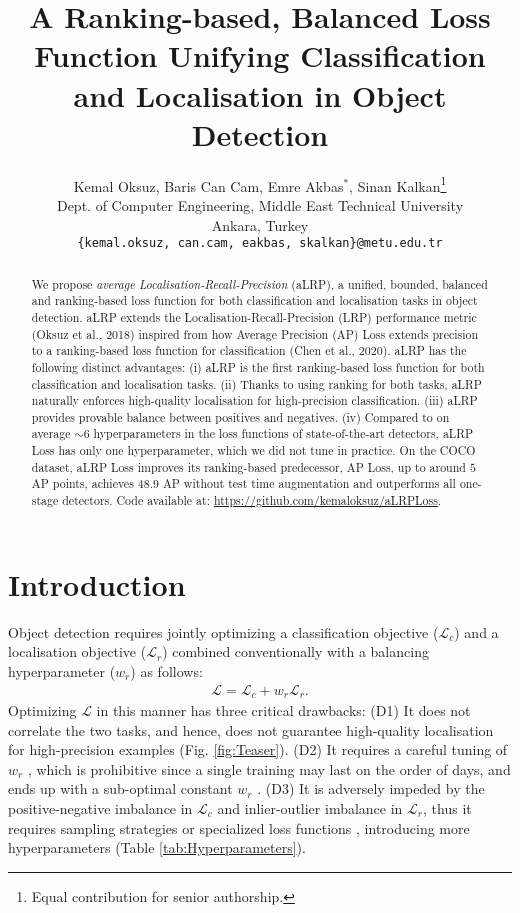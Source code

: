 \documentclass{article}
\title{A Ranking-based, Balanced Loss Function Unifying Classification and Localisation in Object Detection }
\author{Kemal Oksuz, Baris Can Cam, Emre Akbas$^*$, Sinan Kalkan\thanks{Equal contribution for senior authorship.}\\
  Dept. of Computer Engineering, Middle East Technical University\\
  Ankara, Turkey \\
  \texttt{\{kemal.oksuz, can.cam, eakbas, skalkan\}@metu.edu.tr} 
}
\begin{document}
\maketitle

\begin{abstract}
We propose \textit{average Localisation-Recall-Precision} (aLRP), a unified, bounded, balanced and ranking-based loss function for both classification and localisation tasks in object detection. aLRP extends the Localisation-Recall-Precision (LRP) performance metric (Oksuz et al., 2018) inspired from how Average Precision (AP) Loss extends precision to a ranking-based loss function for classification (Chen et al., 2020). aLRP has the following distinct advantages: (i) aLRP is the first ranking-based loss function for both classification and localisation tasks. (ii) Thanks to using ranking for both tasks, aLRP naturally enforces high-quality localisation for high-precision classification. (iii) aLRP provides provable balance between positives and negatives. (iv) Compared to on average $\sim$6 hyperparameters in the loss functions of state-of-the-art detectors, aLRP Loss has only one hyperparameter, which we did not tune in practice. On the COCO dataset, aLRP Loss improves its ranking-based predecessor, AP Loss, up to around $5$ AP points, achieves $48.9$ AP without test time augmentation and outperforms all one-stage detectors. Code available at: \url{https://github.com/kemaloksuz/aLRPLoss}.











\end{abstract}

\section{Introduction}
\label{sec:intro}
Object detection requires jointly optimizing a classification objective ($\mathcal{L}_c$) and a localisation objective ($\mathcal{L}_r$) combined conventionally with a balancing hyperparameter ($w_r$) as follows: 
\begin{align}
    \mathcal{L} = \mathcal{L}_c + w_r \mathcal{L}_r.
    \label{eq:classical_loss}
\end{align}
Optimizing $\mathcal{L}$ in this manner has three critical drawbacks: (D1) It does not correlate the two tasks, and hence, does not guarantee high-quality localisation for high-precision examples (Fig. \ref{fig:Teaser}). (D2) It requires a careful tuning of $w_r$ \cite{CenterNet,GIoULoss,FreeAnchor}, which is prohibitive since a single training may last on the order of days, and ends up with a sub-optimal constant $w_r$ \cite{LapNet,WrLearningviaUncertainty}. (D3) It is adversely impeded by the positive-negative imbalance in $\mathcal{L}_c$ and inlier-outlier imbalance in $\mathcal{L}_r$, thus it requires sampling strategies \cite{gradientharmonizing, FocalLoss} or specialized loss functions \cite{FastRCNN, LibraRCNN}, introducing more hyperparameters (Table \ref{tab:Hyperparameters}). 
\end{document}

